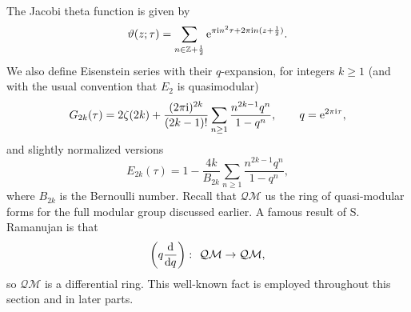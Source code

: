 \documentclass[10pt,a4paper]{amsart}
\numberwithin{equation}{section}
\theoremstyle{definition}
\begin{document}
The Jacobi theta function is given by
\[
\vartheta(z;\tau)=\sum_{n \in \mathbb{Z}+\frac12} {\rm e}^{\pi {\rm i} n^2 \tau+2 \pi {\rm i} n(z+\frac12)}.
\]
We also define Eisenstein series with their $q$-expansion, for integers $k\geq1$ (and with the usual convention that $E_2$ is quasimodular)
\[
G_{2k}(\tau)=2 \zeta(2k)+\frac{(2\pi {\rm i})^{2k}}{(2k-1)!} \sum_{n \geq 1} \frac{n^{2k-1}q^n}{1-q^n}, \qquad q={\rm e}^{2 \pi {\rm i} \tau},
\]
and slightly normalized versions
\begin{equation} \label{eis}
E_{2k}(\tau)=1-\frac{4k}{B_{2k}}\sum_{n \geq 1} \frac{n^{2k-1} q^n}{1-q^n},
\end{equation}
where $B_{2k}$ is the Bernoulli number. Recall that $\mathcal{QM}$ us the ring of quasi-modular forms for the full modular group discussed earlier. A famous result of S. Ramanujan is that
\[
\left(q \frac{{\rm d}}{{\rm d}q} \right)\colon \ \mathcal{QM} \rightarrow \mathcal{QM},
\]
so $\mathcal{QM}$ is a differential ring. This well-known fact is employed throughout this section and in later parts.
\end{document}
